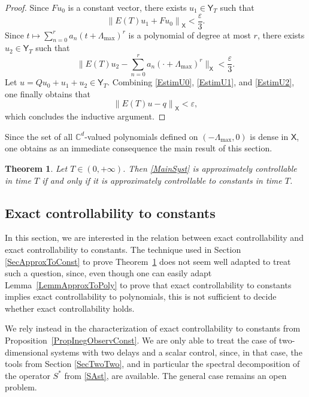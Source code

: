 \documentclass[JEP,XML,SOM,Unicode]{cedram}
\theoremstyle{plain}
\newtheorem{theo}{Theorem}[section]
\theoremstyle{definition}
\newcommand{\norm}[1]{\left\lVert #1\right\lVert}
\newcommand{\bgnorm}[1]{\biggl\lVert #1\biggr\lVert}
\begin{document}
\begin{proof}
Since $F u_0$ is a constant vector, there exists $u_1 \in \mathsf Y_T$ such that
\begin{equation}
\label{EstimU1}
\norm{E(T) u_1 + F u_0}_{\mathsf X} < \frac{\varepsilon}{3}.
\end{equation}
Since $t \mapsto \sum_{n=0}^r a_n (t + \Lambda_{\max})^r$ is a polynomial of degree at most $r$, there exists $u_2 \in \mathsf Y_T$ such that
\begin{equation}
\label{EstimU2}
\bgnorm{E(T) u_2 - \sum_{n=0}^r a_n (\cdot + \Lambda_{\max})^r}_{\mathsf X} < \frac{\varepsilon}{3}.
\end{equation}
Let $u = Q u_0 + u_1 + u_2 \in \mathsf Y_T$. Combining \eqref{EstimU0}, \eqref{EstimU1}, and \eqref{EstimU2}, one finally obtains that
\[
\norm{E(T) u - q}_{\mathsf X} < \varepsilon,
\]
which concludes the inductive argument.
\end{proof}

Since the set of all $\mathbb C^d$-valued polynomials defined on $(-\Lambda_{\max}, 0)$ is dense in $\mathsf X$, one obtains as an immediate consequence the main result of this section.

\begin{theo}
\label{TheoApproxConstant}
Let $T \in (0, +\infty)$. Then \eqref{MainSyst} is approximately controllable in time $T$ if and only if it is approximately controllable to constants in time $T$.
\end{theo}

\subsection{Exact controllability to constants}

In this section, we are interested in the relation between exact controllability and exact controllability to constants. The technique used in Section \ref{SecApproxToConst} to prove Theorem~\ref{TheoApproxConstant} does not seem well adapted to treat such a question, since, even though one can easily adapt Lemma~\ref{LemmApproxToPoly} to prove that exact controllability to constants implies exact controllability to polynomials, this is not sufficient to decide whether exact controllability holds.

We rely instead in the characterization of exact controllability to constants from Proposition~\ref{PropInegObservConst}. We are only able to treat the case of two-dimensional systems with two delays and a scalar control, since, in that case, the tools from Section \ref{SecTwoTwo}, and in particular the spectral decomposition of the operator $S^\ast$ from \eqref{SAst}, are available. The general case remains an open problem.
\end{document}
